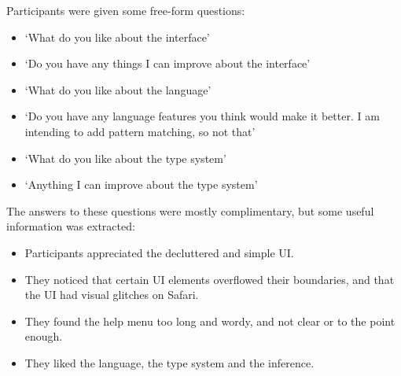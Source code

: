 
Participants were given some free-form questions:
\begin{itemize}
    \item `What do you like about the interface'
    \item `Do you have any things I can improve about the interface'
    \item `What do you like about the language'
    \item `Do you have any language features you think would make it better. I am intending to add pattern matching, so not that'
    \item `What do you like about the type system'
    \item `Anything I can improve about the type system'
\end{itemize}

The answers to these questions were mostly complimentary, but some useful information was extracted:
\begin{itemize}
    \item Participants appreciated the decluttered and simple UI. 
    \item They noticed that certain UI elements overflowed their boundaries, and that the UI had visual glitches on Safari.
    \item They found the help menu too long and wordy, and not clear or to the point enough.
    \item They liked the language, the type system and the inference. 
\end{itemize}


